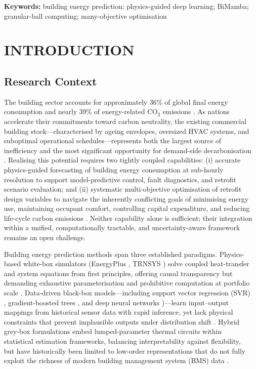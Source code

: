 \documentclass[11pt]{article}
\begin{document}
\noindent\textbf{Keywords:} building energy prediction; physics-guided deep learning; BiMamba; granular-ball computing; many-objective optimisation

\section{INTRODUCTION}

\subsection{Research Context}
The building sector accounts for approximately 36\% of global final energy consumption and nearly 39\% of energy-related CO$_2$ emissions \cite{1,2}. As nations accelerate their commitments toward carbon neutrality, the existing commercial building stock---characterised by ageing envelopes, oversized HVAC systems, and suboptimal operational schedules---represents both the largest source of inefficiency and the most significant opportunity for demand-side decarbonisation \cite{3}. Realising this potential requires two tightly coupled capabilities: (i) accurate physics-guided forecasting of building energy consumption at sub-hourly resolution to support model-predictive control, fault diagnostics, and retrofit scenario evaluation; and (ii) systematic multi-objective optimisation of retrofit design variables to navigate the inherently conflicting goals of minimising energy use, maintaining occupant comfort, controlling capital expenditure, and reducing life-cycle carbon emissions \cite{4,5}. Neither capability alone is sufficient; their integration within a unified, computationally tractable, and uncertainty-aware framework remains an open challenge.

Building energy prediction methods span three established paradigms. Physics-based white-box simulators (EnergyPlus \cite{6}, TRNSYS \cite{7}) solve coupled heat-transfer and system equations from first principles, offering causal transparency but demanding exhaustive parameterisation and prohibitive computation at portfolio scale \cite{8}. Data-driven black-box models---including support vector regression (SVR) \cite{9}, gradient-boosted trees \cite{10}, and deep neural networks \cite{11})---learn input--output mappings from historical sensor data with rapid inference, yet lack physical constraints that prevent implausible outputs under distribution shift \cite{12}. Hybrid grey-box formulations embed lumped-parameter thermal circuits within statistical estimation frameworks, balancing interpretability against flexibility, but have historically been limited to low-order representations that do not fully exploit the richness of modern building management system (BMS) data \cite{13,14}.
\end{document}
